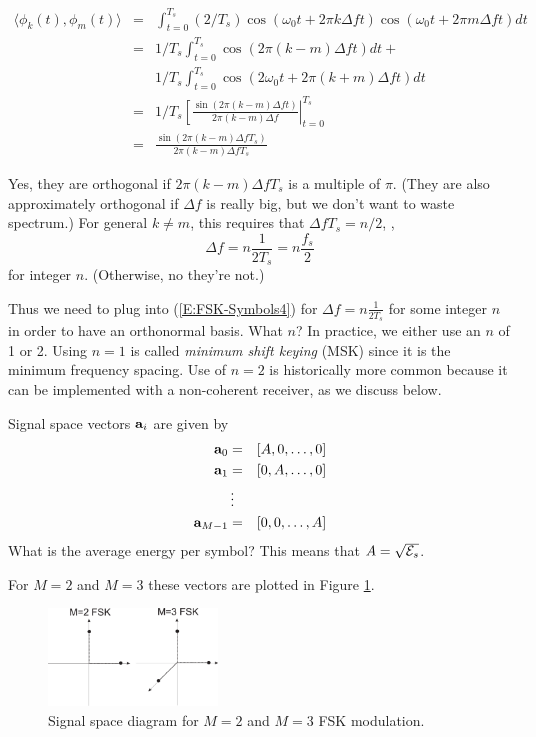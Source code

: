 \begin{eqnarray}
 \langle \phi_k(t), \phi_m(t) \rangle &=&  \int_{t=0}^{T_s} (2/T_{s}) \cos(\omega_0 t + 2\pi k\Delta f t)  \cos(\omega_0 t + 2\pi m\Delta f t) dt
     \nonumber \\
   &=& 1/T_{s} \int_{t=0}^{T_{s}} \cos(2\pi (k-m)\Delta f t) dt +
   \nonumber \\
   & & 1/T_{s} \int_{t=0}^{T_{s}} \cos(2 \omega_0 t + 2\pi (k+m)\Delta f  t) dt
     \nonumber \\
   &=& 1/T_{s} \left[ \frac{\sin(2\pi (k-m)\Delta f t)}{2\pi (k-m)\Delta f } \right|_{t=0}^{T_{s}}
     \nonumber \\
   &=&  \frac{\sin(2\pi (k-m)\Delta f T_{s})}{2\pi (k-m)\Delta f T_{s}}
     \nonumber
\end{eqnarray}

Yes, they are orthogonal if $2\pi (k-m)\Delta f T_{s}$ is a multiple
of $\pi$.  (They are also approximately orthogonal if $\Delta f$ is really big, but we don't want to waste spectrum.) For general $k\ne m$, this requires that $\Delta f T_{s}
= n/2$, \ie,
\begin{equation} \label{E:Delta_f_FSK}
  \Delta f = n \frac{1}{2T_{s}} = n \frac{f_{s}}{2}
\end{equation}
for integer $n$. (Otherwise, no they're not.)

Thus we need to plug into (\ref{E:FSK-Symbols4}) for $\Delta f = n
\frac{1}{2T_{s}}$ for some integer $n$ in order to have an
orthonormal basis.  What $n$?  In practice, we either use an $n$
of 1 or 2. Using $n=1$ is called \emph{minimum shift keying} (MSK) since it is the minimum frequency spacing.  Use of $n=2$ is historically more common because it can be implemented with a non-coherent receiver, as we discuss below.

Signal space vectors $\mathbf{a}_i$ are given by
\begin{eqnarray}
  \mathbf{a}_0 &=& [A, 0, \ldots, 0] \nonumber \\
  \mathbf{a}_1 &=& [0, A, \ldots, 0] \nonumber \\
  &\vdots & \nonumber \\
  \mathbf{a}_{M-1} &=& [0, 0, \ldots, A] \nonumber
\end{eqnarray}
What is the average energy per symbol?  This means that $A =
\sqrt{\mathcal{E}_s}$.

For $M=2$ and $M=3$ these vectors are plotted in Figure \ref{F:FSK-signalSpaceDiagram}.

\begin{figure}[htbp]
  \centerline{\includegraphics[width=0.4\textwidth]{../images/FSK-signalSpaceDiagram.eps}}
  \caption{Signal space diagram for $M=2$ and $M=3$ FSK modulation.}
  \label{F:FSK-signalSpaceDiagram}
\end{figure}



